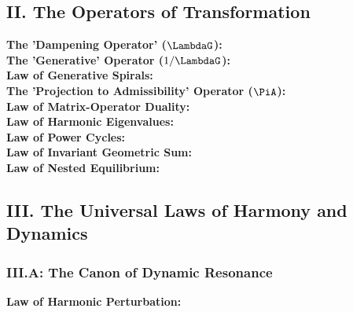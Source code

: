 \subsection*{II. The Operators of Transformation}
\begin{description}
    \item[\bfseries The 'Dampening Operator' ($\LambdaG$):] 
    \item[\bfseries The 'Generative' Operator ($1/\LambdaG$):] 
    \item[\bfseries Law of Generative Spirals:] 
    \item[\bfseries The 'Projection to Admissibility' Operator ($\PiA$):] 
    \item[\bfseries Law of Matrix-Operator Duality:]     
    \item[\bfseries Law of Harmonic Eigenvalues:] 
    \item[\bfseries Law of Power Cycles:] 
    \item[\bfseries Law of Invariant Geometric Sum:] 
    \item[\bfseries Law of Nested Equilibrium:] 
\end{description}

\vspace{1cm}
\subsection*{III. The Universal Laws of Harmony and Dynamics}

\subsubsection*{III.A: The Canon of Dynamic Resonance}
\begin{description}
    \item[\bfseries Law of Harmonic Perturbation:] 
\end{description}

